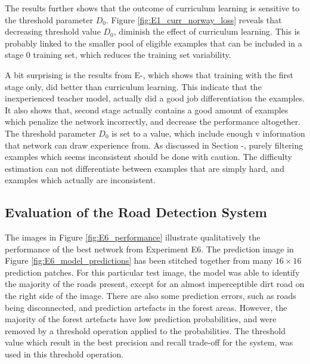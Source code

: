 The results further shows that the outcome of curriculum learning is sensitive to the threshold parameter $D_0$. Figure \ref{fig:E1_curr_norway_loss} reveals that decreasing threshold value $D_0$, diminish the effect of curriculum learning. This is probably linked to the smaller pool of eligible examples that can be included in a stage 0 training set, which reduces the training set variability.  

A bit surprising is the results from E-, which shows that training with the first stage only, did better than curriculum learning. This indicate that the inexperienced teacher model, actually did a good job differentiation the examples. It also shows that, second stage actually contains a good amount of examples which penalize the network incorrectly, and decrease the performance altogether. The threshold parameter $D_0$ is set to a value, which include enough v information that network can draw experience from. As discussed in Section -, purely filtering examples which seems inconsistent should be done with caution. The difficulty estimation can not differentiate between examples that are simply hard, and examples which actually are inconsistent. 


\todo[inline]{}
\subsection{Evaluation of the Road Detection System}
The images in Figure \ref{fig:E6_performance} illustrate qualitatively the performance of the best network from Experiment E6. The prediction image in Figure \ref{fig:E6_model_predictions} has been stitched together from many $16 \times 16$ prediction patches. For this particular test image, the model was able to identify the majority of the roads present, except for an almost imperceptible dirt road on the right side of the image. There are also some prediction errors, such as roads being disconnected, and prediction artefacts in the forest areas. However, the majority of the forest artefacts have low prediction probabilities, and were removed by a threshold operation applied to the probabilities. The threshold value which result in the best precision and recall trade-off for the system, was used in this threshold operation.\\


